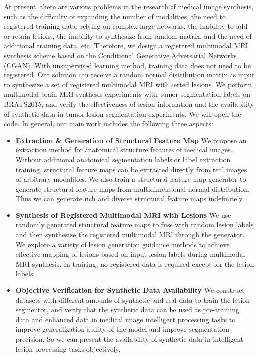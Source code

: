 \documentclass[letterpaper]{article} %
\begin{document}
At present, there are various problems in the research of medical image synthesis, such as the difficulty of expanding the number of modalities, the need to registered training data, relying on complex large networks, the inability to add or retain lesions, the inability to synthesize from random matrix, and the need of additional training data, etc. Therefore, we design a registered multimodal MRI synthesis scheme based on the Conditional Generative Adversarial Networks (CGAN)\cite{70mirza2014conditional}. With unsupervised learning method, training data does not need to be registered. Our solution can receive a random normal distribution matrix as input to synthesize a set of registered multimodal MRI with setted lesions. We perform multimodal brain MRI synthesis experiments with tumor segmentation labels on BRATS2015, and verify the effectiveness of lesion information and the availability of synthetic data in tumor lesion segmentation experiments. We will open the code. In general, our main work includes the following three aspects:

\begin{itemize}
	\item \textbf{Extraction \& Generation of Structural Feature Map}
	We propose an extraction method for anatomical structure features of medical images. Without additional anatomical segmentation labels or label extraction training, structural feature maps can be extracted directly from real images of arbitrary modalities. We also train a structural feature map generator to generate structural feature maps from multidimensional normal distribution. Thus we can generate rich and diverse structural feature maps indefinitely.
	\item \textbf{Synthesis of Registered Multimodal MRI with Lesions}	
	We use randomly generated structural feature maps to fuse with random lesion labels and then synthesize the registered multimodal MRI through the generator. We explore a variety of lesion generation guidance methods to achieve effective mapping of lesions based on input lesion labels during multimodal MRI synthesis. In training, no registered data is required except for the lesion labels. 
	\item \textbf{Objective Verification for Synthetic Data Availability}
	We construct datasets with different amounts of synthetic and real data to train the lesion segmentor, and verify that the synthetic data can be used as pre-training data and enhanced data in medical image intelligent processing tasks to improve generalization ability of the model and improve segmentation precision. So we can present the availability of synthetic data in intelligent lesion processing tasks objectively.
\end{itemize}
\end{document}
